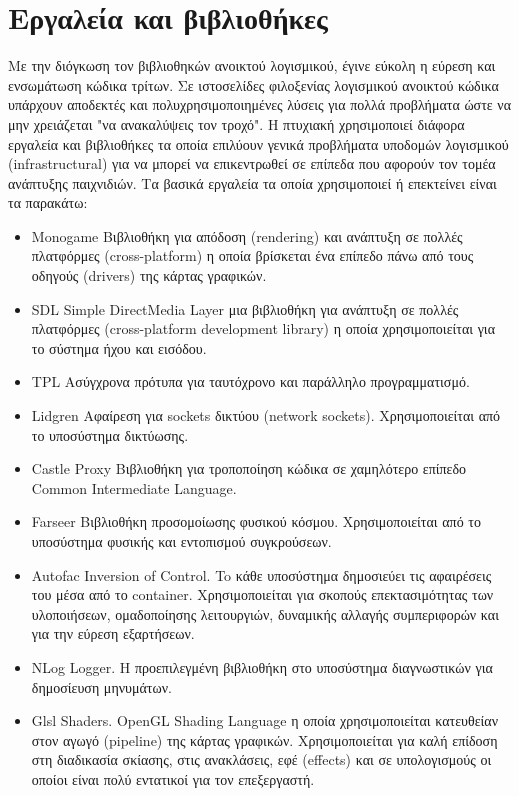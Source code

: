 \section{Εργαλεία και βιβλιοθήκες}
Με την διόγκωση τον βιβλιοθηκών ανοικτού λογισμικού, έγινε εύκολη η εύρεση και ενσωμάτωση κώδικα τρίτων. Σε ιστοσελίδες φιλοξενίας λογισμικού ανοικτού κώδικα υπάρχουν αποδεκτές και πολυχρησιμοποιημένες λύσεις για πολλά προβλήματα ώστε να μην χρειάζεται "να ανακαλύψεις τον τροχό". Η πτυχιακή χρησιμοποιεί διάφορα εργαλεία και βιβλιοθήκες τα οποία επιλύουν γενικά προβλήματα υποδομών λογισμικού (infrastructural) για να μπορεί να επικεντρωθεί σε επίπεδα που αφορούν τον τομέα ανάπτυξης παιχνιδιών. Τα βασικά εργαλεία τα οποία χρησιμοποιεί ή επεκτείνει είναι τα παρακάτω:
\begin{itemize}
	\item{Monogame} Βιβλιοθήκη για απόδοση (rendering)  και ανάπτυξη σε πολλές πλατφόρμες (cross-platform) η οποία βρίσκεται ένα επίπεδο πάνω από τους οδηγούς (drivers) της κάρτας γραφικών.
	\item{SDL} Simple DirectMedia Layer μια βιβλιοθήκη για ανάπτυξη σε πολλές πλατφόρμες (cross-platform development library) η οποία χρησιμοποιείται για το σύστημα ήχου και εισόδου.
	\item{TPL} Ασύγχρονα πρότυπα για ταυτόχρονο και παράλληλο προγραμματισμό.
	\item{Lidgren} Αφαίρεση για sockets δικτύου (network sockets). Χρησιμοποιείται από το υποσύστημα δικτύωσης.
	\item{Castle Proxy} Βιβλιοθήκη για τροποποίηση κώδικα σε χαμηλότερο επίπεδο \gls{Common Intermediate Language}.
	\item{Farseer} Βιβλιοθήκη προσομοίωσης φυσικού κόσμου. Χρησιμοποιείται από το υποσύστημα φυσικής και εντοπισμού συγκρούσεων.
	\item{Autofac} Inversion of Control. To κάθε υποσύστημα δημοσιεύει τις αφαιρέσεις του μέσα από το container. Χρησιμοποιείται για σκοπούς επεκτασιμότητας των υλοποιήσεων, ομαδοποίησης λειτουργιών, δυναμικής αλλαγής συμπεριφορών και για την εύρεση εξαρτήσεων.
	\item{NLog} Logger. H προεπιλεγμένη βιβλιοθήκη στο υποσύστημα διαγνωστικών για δημοσίευση μηνυμάτων.
	\item{Glsl} Shaders. OpenGL Shading Language η οποία χρησιμοποιείται κατευθείαν στον αγωγό (pipeline) της κάρτας γραφικών. Χρησιμοποιείται για καλή επίδοση στη διαδικασία σκίασης, στις ανακλάσεις, εφέ (effects) και σε υπολογισμούς οι οποίοι είναι πολύ εντατικοί για τον επεξεργαστή.

\end{itemize}
